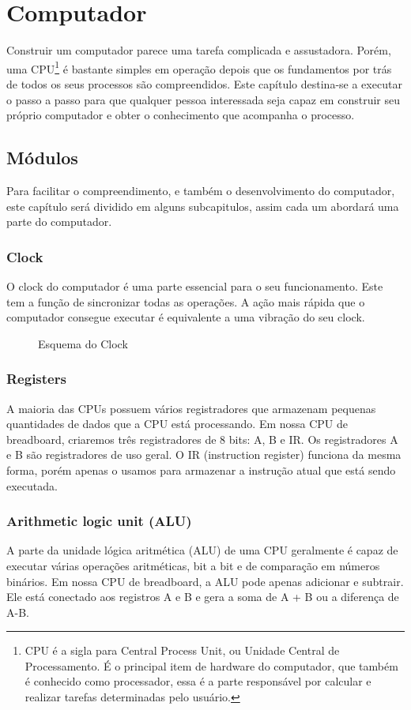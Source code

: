 \section{Computador} 
Construir um computador parece uma tarefa complicada e assustadora. Porém, uma CPU\footnote{CPU é a sigla para Central Process Unit, ou Unidade Central de Processamento. É o principal item de hardware do computador, que também é conhecido como processador, essa é a parte responsável por calcular e realizar tarefas determinadas pelo usuário.} é bastante simples em operação depois que os fundamentos por trás de todos os seus processos são compreendidos. Este capítulo destina-se a executar o passo a passo para que qualquer pessoa interessada seja capaz em construir seu próprio computador e obter o conhecimento que acompanha o processo.

\subsection{Módulos}
Para facilitar o compreendimento, e também o desenvolvimento do computador, este capítulo será dividido em alguns subcapitulos, assim cada um abordará uma parte do computador. 

\subsubsection{Clock}
O clock do computador é uma parte essencial para o seu funcionamento. Este tem a função de sincronizar todas as operações. A ação mais rápida que o computador consegue executar é equivalente a uma vibração do seu clock.
\begin{figure}[H] \centering 
  \caption{\label{fig:1} Esquema do Clock} 
\end{figure}

\subsubsection{Registers}
A maioria das CPUs possuem vários registradores que armazenam pequenas quantidades de dados que a CPU está processando. Em nossa CPU de breadboard, criaremos três registradores de 8 bits: A, B e IR. Os registradores A e B são registradores de uso geral. O IR (instruction register) funciona da mesma forma, porém apenas o usamos para armazenar a instrução atual que está sendo executada.

\subsubsection{Arithmetic logic unit (ALU)}
A parte da unidade lógica aritmética (ALU) de uma CPU geralmente é capaz de executar várias operações aritméticas, bit a bit e de comparação em números binários. Em nossa CPU de breadboard, a ALU pode apenas adicionar e subtrair. Ele está conectado aos registros A e B e gera a soma de A + B ou a diferença de A-B.

